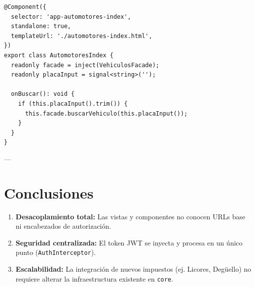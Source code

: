 \documentclass[12pt,a4paper]{article}
\begin{document}
\begin{lstlisting}[caption={Presentación: AutomotoresIndex}]
@Component({
  selector: 'app-automotores-index',
  standalone: true,
  templateUrl: './automotores-index.html',
})
export class AutomotoresIndex {
  readonly facade = inject(VehiculosFacade);
  readonly placaInput = signal<string>('');

  onBuscar(): void {
    if (this.placaInput().trim()) {
      this.facade.buscarVehiculo(this.placaInput());
    }
  }
}
\end{lstlisting}

---

\section{Conclusiones}

\begin{enumerate}
    \item \textbf{Desacoplamiento total:} Las vistas y componentes no conocen URLs base ni encabezados de autorización.
    \item \textbf{Seguridad centralizada:} El token JWT se inyecta y procesa en un único punto (\texttt{AuthInterceptor}).
    \item \textbf{Escalabilidad:} La integración de nuevos impuestos (ej. Licores, Degüello) no requiere alterar la infraestructura existente en \texttt{core}.
\end{enumerate}
\end{document}

